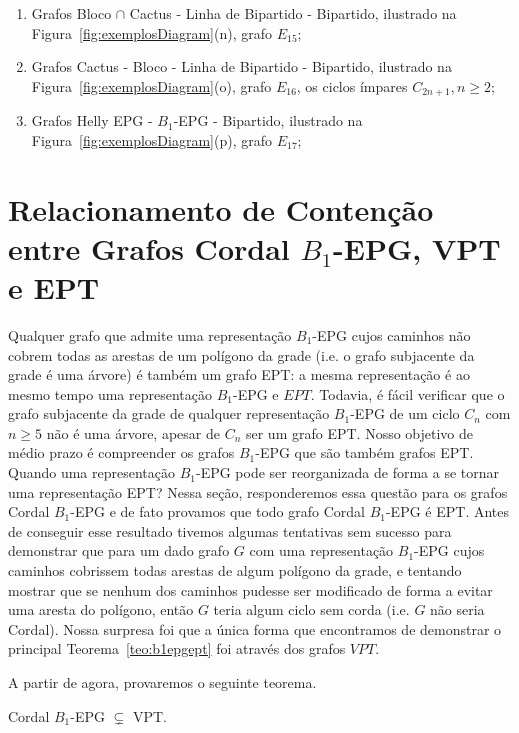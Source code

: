 \begin{enumerate}[label=(\arabic*)]
      \item Grafos Bloco $\cap$  Cactus -  Linha de Bipartido - Bipartido, ilustrado na Figura~\ref{fig:exemplosDiagram}(n), grafo $E_{15}$;%
      \item Grafos Cactus - Bloco -  Linha de Bipartido - Bipartido, ilustrado na Figura~\ref{fig:exemplosDiagram}(o), grafo $E_{16}$, os ciclos ímpares $C_{2n+1},n\geq 2$;%
      \item Grafos Helly EPG - $B_1$-EPG  - Bipartido, ilustrado na Figura~\ref{fig:exemplosDiagram}(p), grafo  $E_{17}$;%
\end{enumerate}



\section{Relacionamento de Contenção entre Grafos Cordal $B_1$-EPG, VPT e EPT}


 Qualquer grafo que admite uma representação $B_1$-EPG  cujos caminhos não cobrem todas as arestas de um polígono da grade  (i.e. o grafo subjacente da grade é uma árvore) é também um grafo EPT: a mesma representação é ao mesmo tempo uma representação $B_1$-EPG e $EPT$.
Todavia, é fácil verificar que o grafo subjacente da grade de qualquer representação $B_1$-EPG de um ciclo $C_n$ com  $n\geq 5$ não é uma árvore,
apesar de $C_n$ ser um grafo  EPT. Nosso objetivo de médio prazo é compreender os grafos $B_1$-EPG que são também grafos  EPT. Quando uma representação $B_1$-EPG pode ser reorganizada de forma a se tornar uma representação EPT? Nessa seção, responderemos essa questão para os grafos   Cordal $B_1$-EPG e de fato provamos que todo grafo Cordal $B_1$-EPG é EPT. Antes de conseguir esse resultado tivemos algumas tentativas sem sucesso para demonstrar que para um dado grafo $G$ com uma representação $B_1$-EPG cujos caminhos cobrissem todas arestas de algum polígono da  grade, e tentando mostrar que se nenhum dos caminhos pudesse ser modificado de forma a evitar uma aresta do polígono, então   $G$ teria algum ciclo sem corda (i.e. $G$ não seria Cordal).  Nossa surpresa foi que a única forma que encontramos de demonstrar o principal Teorema~\ref{teo:b1epgept} foi através dos grafos $VPT$.

 A partir de agora, provaremos o seguinte teorema.

\begin{theorem}\label{teo:CordalB1inVPT}
Cordal $B_1$-EPG $\subsetneq$ VPT. 
\end{theorem}

